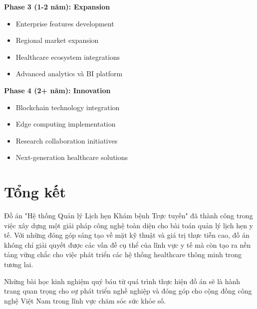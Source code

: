 \documentclass[../DoAn.tex]{subfiles}
\begin{document}
\textbf{Phase 3 (1-2 năm): Expansion}
\begin{itemize}
    \item Enterprise features development
    \item Regional market expansion
    \item Healthcare ecosystem integrations
    \item Advanced analytics và BI platform
\end{itemize}

\textbf{Phase 4 (2+ năm): Innovation}
\begin{itemize}
    \item Blockchain technology integration
    \item Edge computing implementation
    \item Research collaboration initiatives
    \item Next-generation healthcare solutions
\end{itemize}

\section*{Tổng kết}

Đồ án "Hệ thống Quản lý Lịch hẹn Khám bệnh Trực tuyến" đã thành công trong việc xây dựng một giải pháp công nghệ toàn diện cho bài toán quản lý lịch hẹn y tế. Với những đóng góp sáng tạo về mặt kỹ thuật và giá trị thực tiễn cao, đồ án không chỉ giải quyết được các vấn đề cụ thể của lĩnh vực y tế mà còn tạo ra nền tảng vững chắc cho việc phát triển các hệ thống healthcare thông minh trong tương lai.

Những bài học kinh nghiệm quý báu từ quá trình thực hiện đồ án sẽ là hành trang quan trọng cho sự phát triển nghề nghiệp và đóng góp cho cộng đồng công nghệ Việt Nam trong lĩnh vực chăm sóc sức khỏe số.
\end{document}
